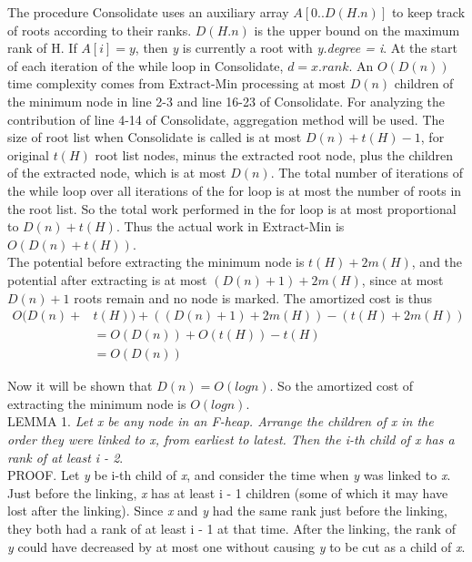 \documentclass[12pt, a4paper]{article}
\begin{document}
	The procedure Consolidate uses an auxiliary array $A[0..D(H.n)]$ to keep track of roots according to their ranks. $D(H.n)$ is the upper bound on the maximum rank of H. If $A[i] = y$, then \textit{y} is currently a root with \textit{y.degree = i}. At the start of each iteration of the while loop in Consolidate, $d = x.rank$. An $O(D(n))$ time complexity comes from Extract-Min processing at most $D(n)$ children of the minimum node in line 2-3 and line 16-23 of Consolidate. For analyzing the contribution of line 4-14 of Consolidate, aggregation method will be used. The size of root list when Consolidate is called is at most $D(n) + t(H) - 1$, for original $t(H)$ root list nodes, minus the extracted root node, plus the children of the extracted node, which is at most $D(n)$. The total number of iterations of the while loop over all iterations of the for loop is at most the number of roots in the root list. So the total work performed in the for loop is at most proportional to $D(n) + t(H)$. Thus the actual work in Extract-Min is $O(D(n) + t(H))$.\\
	The potential before extracting the minimum node is $t(H) + 2m(H)$, and the potential after extracting is at most $(D(n) + 1) + 2m(H)$, since at most $D(n) + 1$ roots remain and no node is marked. The amortized cost is thus 
	\begin{equation*}
		\begin{split}
			O(D(n) +& t(H)) + ((D(n) + 1) + 2m(H)) - (t(H) + 2m(H)) \\
			& = O(D(n)) + O(t(H)) - t(H) \\
			& = O(D(n))
		\end{split}
	\end{equation*}
	
	Now it will be shown that $D(n) = O(log n)$. So the amortized cost of extracting the minimum node is $O(log n)$. \\
	\newline
	LEMMA 1. \textit{Let x be any node in an F-heap. Arrange the children of x in the order they were linked to x, from earliest to latest. Then the i-th child of x has a rank of at least i - 2}. \\
	PROOF. Let \textit{y} be i-th child of \textit{x}, and consider the time when \textit{y} was linked to \textit{x}. Just before the linking, \textit{x} has at least i - 1 children (some of which it may have lost after the linking). Since \textit{x} and \textit{y} had the same rank just before the linking, they both had a rank of at least i - 1 at that time. After the linking, the rank of \textit{y} could have decreased by at most one without causing \textit{y} to be cut as a child of \textit{x}.\\
	\newline
	
\end{document}
